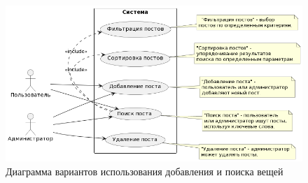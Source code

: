 \begin{figure}[htb]
	\centering
	\includegraphics[width=.9\textwidth]{images/seach-diagram-2.png}
	\parskip=6pt
	\caption{Диаграмма вариантов использования добавления и поиска вещей}
	\label{fig:searchDiagram2}
\end{figure}

